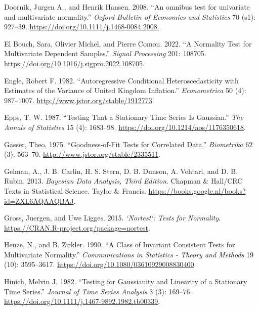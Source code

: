 \begin{CSLReferences}{1}{0}
\leavevmode{}%
Doornik, Jurgen A., and Henrik Hansen. 2008. {``{An omnibus test for univariate and multivariate normality}.''} \emph{Oxford Bulletin of Economics and Statistics} 70 (s1): 927--39. \url{https://doi.org/10.1111/j.1468-0084.2008.}

\leavevmode{}%
El Bouch, Sara, Olivier Michel, and Pierre Comon. 2022. {``A Normality Test for Multivariate Dependent Samples.''} \emph{Signal Processing} 201: 108705. \url{https://doi.org/10.1016/j.sigpro.2022.108705}.

\leavevmode{}%
Engle, Robert F. 1982. {``Autoregressive Conditional Heteroscedasticity with Estimates of the Variance of United Kingdom Inflation.''} \emph{Econometrica} 50 (4): 987--1007. \url{http://www.jstor.org/stable/1912773}.

\leavevmode{}%
Epps, T. W. 1987. {``Testing That a Stationary Time Series Is {G}aussian.''} \emph{The Annals of Statistics} 15 (4): 1683--98. \url{https://doi.org/10.1214/aos/1176350618}.

\leavevmode{}%
Gasser, Theo. 1975. {``Goodness-of-Fit Tests for Correlated Data.''} \emph{Biometrika} 62 (3): 563--70. \url{http://www.jstor.org/stable/2335511}.

\leavevmode{}%
Gelman, A., J. B. Carlin, H. S. Stern, D. B. Dunson, A. Vehtari, and D. B. Rubin. 2013. \emph{Bayesian Data Analysis, Third Edition}. Chapman \& Hall/CRC Texts in Statistical Science. Taylor \& Francis. \url{https://books.google.nl/books?id=ZXL6AQAAQBAJ}.

\leavevmode{}%
Gross, Juergen, and Uwe Ligges. 2015. \emph{`Nortest`: Tests for Normality}. \url{https://CRAN.R-project.org/package=nortest}.

\leavevmode{}%
Henze, N., and B. Zirkler. 1990. {``A Class of Invariant Consistent Tests for Multivariate Normality.''} \emph{Communications in Statistics - Theory and Methods} 19 (10): 3595--3617. \url{https://doi.org/10.1080/03610929008830400}.

\leavevmode{}%
Hinich, Melvin J. 1982. {``Testing for {G}aussianity and Linearity of a Stationary Time Series.''} \emph{Journal of Time Series Analysis} 3 (3): 169--76. \url{https://doi.org/10.1111/j.1467-9892.1982.tb00339}.


\end{CSLReferences}
